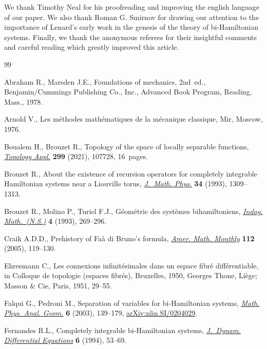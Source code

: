 \documentclass[10pt,a4paper]{amsart}
\numberwithin{equation}{section}
\begin{document}
We thank Timothy Neal for his proofreading and improving the english language of our paper. We also thank Roman G. Smirnov for drawing our attention to the importance of Lenard's early work in the genesis of the theory of bi-Hamiltonian systems. Finally, we thank the anonymous referees for their insightful comments and careful reading which greatly improved this article.


\begin{thebibliography}{99}
\footnotesize\itemsep=0pt

Abraham R., Marsden J.E., Foundations of mechanics, 2nd~ed., Benjamin/Cummings
 Publishing Co., Inc., Advanced Book Program, Reading, Mass., 1978.

Arnold V., Les m\'ethodes math\'ematiques de la m\'ecanique classique, Mir,
 Moscow, 1976.

Boualem H., Brouzet R., Topology of the space of locally separable functions,
 \href{https://doi.org/10.1016/j.topol.2021.107728}{\textit{Topology Appl.}} \textbf{299} (2021), 107728, 16~pages.

Brouzet R., About the existence of recursion operators for completely
 integrable {H}amiltonian systems near a {L}iouville torus, \href{https://doi.org/10.1063/1.530212}{\textit{J.~Math.
 Phys.}} \textbf{34} (1993), 1309--1313.

Brouzet R., Molino P., Turiel F.J., G\'eom\'etrie des syst\`emes
 bihamiltoniens, \href{https://doi.org/10.1016/0019-3577(93)90002-G}{\textit{Indag. Math.~(N.S.)}} \textbf{4} (1993), 269--296.

Craik A.D.D., Prehistory of {F}a\`a di {B}runo's formula, \href{https://doi.org/10.2307/30037410}{\textit{Amer. Math.
 Monthly}} \textbf{112} (2005), 119--130.

Ehresmann C., Les connexions infinit\'esimales dans un espace fibr\'e
 diff\'erentiable, in Colloque de topologie (espaces fibr\'es), {B}ruxelles,
 1950, Georges Thone, Li\`ege; Masson \& Cie, Paris, 1951, 29--55.

Falqui G., Pedroni M., Separation of variables for bi-{H}amiltonian systems,
 \href{https://doi.org/10.1023/A:1024080315471}{\textit{Math. Phys. Anal. Geom.}} \textbf{6} (2003), 139--179,
 \href{https://arxiv.org/abs/nlin.SI/0204029}{arXiv:nlin.SI/0204029}.

Fernandes R.L., Completely integrable bi-{H}amiltonian systems,
 \href{https://doi.org/10.1007/BF02219188}{\textit{J.~Dynam. Differential Equations}} \textbf{6} (1994), 53--69.


\end{thebibliography}
\end{document}
